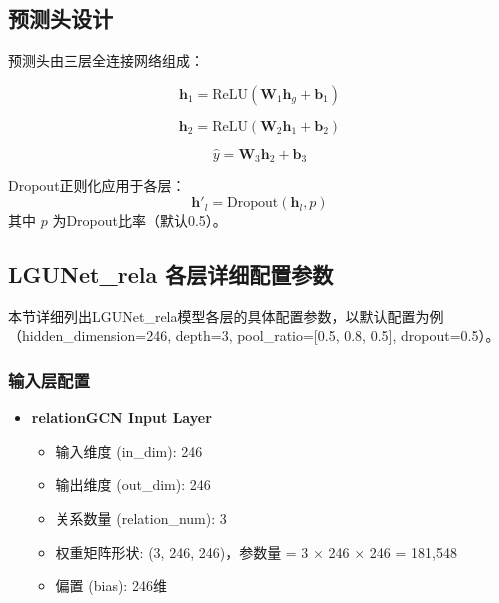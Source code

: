 \documentclass[UTF8, a4paper, 12pt]{article}
\begin{document}
\subsection{预测头设计}

预测头由三层全连接网络组成：

\begin{equation}
\mathbf{h}_1 = \text{ReLU}\left( \mathbf{W}_1 \mathbf{h}_g + \mathbf{b}_1 \right)
\end{equation}

\begin{equation}
\mathbf{h}_2 = \text{ReLU}\left( \mathbf{W}_2 \mathbf{h}_1 + \mathbf{b}_2 \right)
\end{equation}

\begin{equation}
\hat{y} = \mathbf{W}_3 \mathbf{h}_2 + \mathbf{b}_3
\end{equation}

Dropout正则化应用于各层：
\begin{equation}
\mathbf{h}'_l = \text{Dropout}(\mathbf{h}_l, p)
\end{equation}
其中 $p$ 为Dropout比率（默认0.5）。

\subsection{LGUNet\_rela 各层详细配置参数}

本节详细列出LGUNet\_rela模型各层的具体配置参数，以默认配置为例（hidden\_dimension=246, depth=3, pool\_ratio=[0.5, 0.8, 0.5], dropout=0.5）。

\subsubsection{输入层配置}

\begin{itemize}
    \item \textbf{relationGCN Input Layer}
    \begin{itemize}
        \item 输入维度 (in\_dim): 246
        \item 输出维度 (out\_dim): 246
        \item 关系数量 (relation\_num): 3
        \item 权重矩阵形状: (3, 246, 246)，参数量 = 3 $\times$ 246 $\times$ 246 = 181,548
        \item 偏置 (bias): 246维
    \end{itemize}
\end{itemize}
\end{document}
